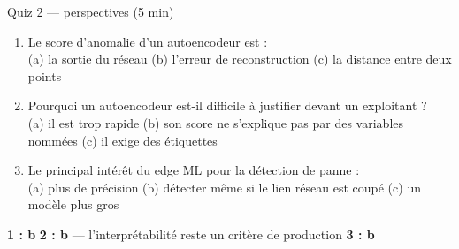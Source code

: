 \begin{frame}{Quiz 2 --- perspectives (5 min)}
\begin{qbox}[3 questions]
\begin{enumerate}
\item Le score d'anomalie d'un autoencodeur est :\\
(a) la sortie du réseau \quad (b) l'erreur de reconstruction \quad (c) la
distance entre deux points
\item Pourquoi un autoencodeur est-il difficile à justifier devant un
exploitant ?\\
(a) il est trop rapide \quad (b) son score ne s'explique pas par des
variables nommées \quad (c) il exige des étiquettes
\item Le principal intérêt du edge ML pour la détection de panne :\\
(a) plus de précision \quad (b) détecter même si le lien réseau est coupé
\quad (c) un modèle plus gros
\end{enumerate}
\end{qbox}
\vspace{1mm}
\begin{solbox}[Réponses]
\textbf{1 : b} \quad \textbf{2 : b} --- l'interprétabilité reste un critère
de production \quad \textbf{3 : b}
\end{solbox}
\end{frame}
